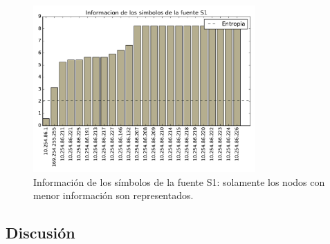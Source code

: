 \begin{figure}[H]
  \centering
  \includegraphics[width=8.5cm]{exp_starbucks/grafico3.pdf}
  \caption{ \normalfont Información de los símbolos de la fuente S1: solamente los nodos con menor información son representados.}
\end{figure}

\subsection{Discusión}

